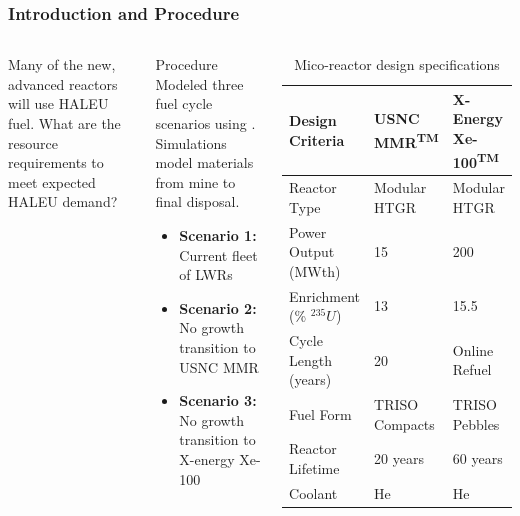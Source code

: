 \begin{frame}
  \frametitle{Introduction and Procedure}
  \begin{columns}
        \column[t]{5cm}
        Many of the new, advanced reactors will use \gls{HALEU} fuel. 
        What are the resource requirements to meet expected \gls{HALEU}
        demand?

        \begin{block}{Procedure}
            Modeled three fuel cycle scenarios using \Cyclus. Simulations 
            model materials from mine to final disposal.
            \begin{itemize}
                \item \textbf{Scenario 1:} Current fleet of \glspl{LWR}
                \item \textbf{Scenario 2:} No growth transition to \gls{USNC} \gls{MMR}
                \item \textbf{Scenario 3:} No growth transition to X-energy Xe-100
            \end{itemize}
 
        \end{block}
        
        \column[t]{5cm}
        \begingroup
        \renewcommand{\arraystretch}{1.5} %
        \begin{table}[t!]
            \tiny
            \caption{Mico-reactor design specifications}
            \label{tab:reactor_summary}
            \begin{tabular}{ p{1.25cm} p{1.25cm} p{1.25cm}}
                \hline
                Design Criteria & \gls{USNC} \gls{MMR}\textsuperscript{TM} & 
                    X-Energy Xe-100\textsuperscript{TM} \\\hline
                
                Reactor Type & Modular HTGR & Modular HTGR \\
                Power Output (MWth) & 15 & 200 \\
                Enrichment (\% $^{235}U$) & 13 & 15.5 \\
                Cycle Length (years) & 20 & Online Refuel\\
                Fuel Form & TRISO Compacts & TRISO Pebbles\\
                Reactor Lifetime & 20 years & 60 years \\
                Coolant & He & He \\
                \hline
            \end{tabular}
        \end{table}   
        \endgroup
  \end{columns}
        
\end{frame}

